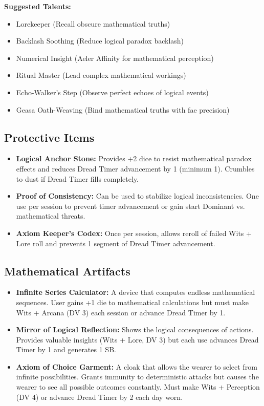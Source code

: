 \documentclass[11pt]{article}
\begin{document}
\textbf{Suggested Talents:}
\begin{itemize}
\item Lorekeeper (Recall obscure mathematical truths)
\item Backlash Soothing (Reduce logical paradox backlash)
\item Numerical Insight (Aeler Affinity for mathematical perception)
\item Ritual Master (Lead complex mathematical workings)
\item Echo-Walker's Step (Observe perfect echoes of logical events)
\item Geasa Oath-Weaving (Bind mathematical truths with fae precision)
\end{itemize}

\subsection{Protective Items}

\begin{itemize}
\item \textbf{Logical Anchor Stone:} Provides +2 dice to resist mathematical paradox effects and reduces Dread Timer advancement by 1 (minimum 1). Crumbles to dust if Dread Timer fills completely.
\item \textbf{Proof of Consistency:} Can be used to stabilize logical inconsistencies. One use per session to prevent timer advancement or gain start Dominant vs. mathematical threats.
\item \textbf{Axiom Keeper's Codex:} Once per session, allows reroll of failed Wits + Lore roll and prevents 1 segment of Dread Timer advancement.
\end{itemize}

\subsection{Mathematical Artifacts}

\begin{itemize}
\item \textbf{Infinite Series Calculator:} A device that computes endless mathematical sequences. User gains +1 die to mathematical calculations but must make Wits + Arcana (DV 3) each session or advance Dread Timer by 1.
\item \textbf{Mirror of Logical Reflection:} Shows the logical consequences of actions. Provides valuable insights (Wits + Lore, DV 3) but each use advances Dread Timer by 1 and generates 1 SB.
\item \textbf{Axiom of Choice Garment:} A cloak that allows the wearer to select from infinite possibilities. Grants immunity to deterministic attacks but causes the wearer to see all possible outcomes constantly. Must make Wits + Perception (DV 4) or advance Dread Timer by 2 each day worn.
\end{itemize}
\end{document}
